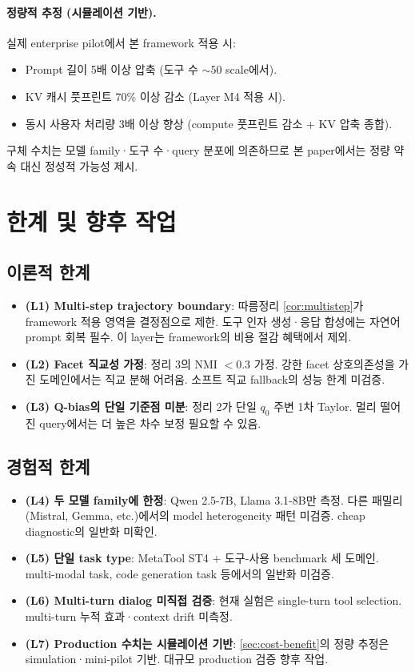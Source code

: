 \documentclass[11pt]{article}
\theoremstyle{definition}
\begin{document}
\paragraph{정량적 추정 (시뮬레이션 기반).}
실제 enterprise pilot에서 본 framework 적용 시:
\begin{itemize}[leftmargin=*]
\item Prompt 길이 5배 이상 압축 (도구 수 $\sim 50$ scale에서).
\item KV 캐시 풋프린트 70\% 이상 감소 (Layer M4 적용 시).
\item 동시 사용자 처리량 3배 이상 향상 (compute 풋프린트 감소 + KV 압축 종합).
\end{itemize}
구체 수치는 모델 family·도구 수·query 분포에 의존하므로 본 paper에서는 정량 약속 대신 정성적 가능성 제시.

\section{한계 및 향후 작업}
\label{sec:limitations}

\subsection{이론적 한계}
\begin{itemize}[leftmargin=*]
\item \textbf{(L1) Multi-step trajectory boundary}: 따름정리 \ref{cor:multistep}가 framework 적용 영역을 결정점으로 제한. 도구 인자 생성·응답 합성에는 자연어 prompt 회복 필수. 이 layer는 framework의 비용 절감 혜택에서 제외.
\item \textbf{(L2) Facet 직교성 가정}: 정리 3의 NMI $< 0.3$ 가정. 강한 facet 상호의존성을 가진 도메인에서는 직교 분해 어려움. 소프트 직교 fallback의 성능 한계 미검증.
\item \textbf{(L3) Q-bias의 단일 기준점 미분}: 정리 2가 단일 $q_0$ 주변 1차 Taylor. 멀리 떨어진 query에서는 더 높은 차수 보정 필요할 수 있음.
\end{itemize}

\subsection{경험적 한계}
\begin{itemize}[leftmargin=*]
\item \textbf{(L4) 두 모델 family에 한정}: Qwen 2.5-7B, Llama 3.1-8B만 측정. 다른 패밀리 (Mistral, Gemma, etc.)에서의 model heterogeneity 패턴 미검증. cheap diagnostic의 일반화 미확인.
\item \textbf{(L5) 단일 task type}: MetaTool ST4 + 도구-사용 benchmark 세 도메인. multi-modal task, code generation task 등에서의 일반화 미검증.
\item \textbf{(L6) Multi-turn dialog 미직접 검증}: 현재 실험은 single-turn tool selection. multi-turn 누적 효과·context drift 미측정.
\item \textbf{(L7) Production 수치는 시뮬레이션 기반}: \cref{sec:cost-benefit}의 정량 추정은 simulation·mini-pilot 기반. 대규모 production 검증 향후 작업.
\end{itemize}
\end{document}
